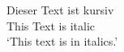 \renewcommand{\exfont}{\itshape}
\ea
\gll Dieser Text ist kursiv\\
     This Text is italic\\
\glt `This text is in italics.'
\z
\renewcommand{\exfont}{\upshape}